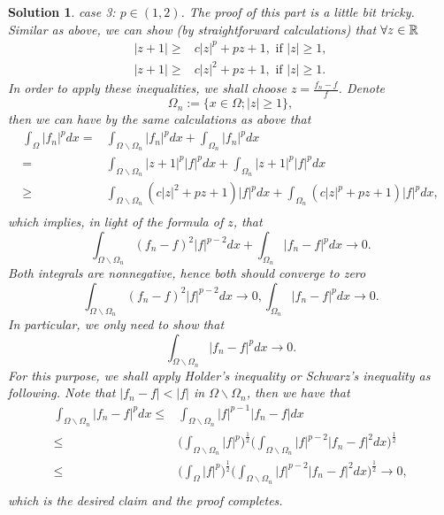 \documentclass[6pt]{article}
\newtheorem{solution}{Solution}
\numberwithin{equation}{section}
\def\mathbb{\Bbb}
\begin{document}
\begin{enumerate}
\begin{solution}
case 3: $p\in(1,2)$.  The proof of this part is a little bit tricky.  Similar as above, we can show (by straightforward calculations) that $\forall z\in\mathbb R$
\begin{align*}
  |z+1| \geq & c|z|^p+pz+1,\text{~if~}|z|\geq1, \\
  |z+1| \geq & c|z|^2+pz+1,\text{~if~}|z|\geq1.
\end{align*}
In order to apply these inequalities, we shall choose $z=\frac{f_n-f}{f}$.  Denote
\[\Omega_n:=\{x\in\Omega; |z|\geq1\},\]
then we can have by the same calculations as above that
\begin{align*}
  \int_\Omega |f_n|^pdx =&\int_{\Omega\backslash\Omega_n}|f_n|^pdx+\int_{\Omega_n}|f_n|^pdx   \\
   =&\int_{\Omega\backslash\Omega_n}|z+1|^p|f|^pdx+\int_{\Omega_n}|z+1|^p|f|^pdx   \\
   \geq & \int_{\Omega\backslash\Omega_n}(c|z|^2+pz+1)|f|^pdx+\int_{\Omega_n}(c|z|^p+pz+1)|f|^pdx,   \\
\end{align*}
which implies, in light of the formula of $z$, that
\[\int_{\Omega\backslash\Omega_n}(f_n-f)^2|f|^{p-2}dx+\int_{\Omega_n}|f_n-f|^pdx\rightarrow 0.\]
Both integrals are nonnegative, hence both should converge to zero
\[\int_{\Omega\backslash\Omega_n}(f_n-f)^2|f|^{p-2}dx\rightarrow 0, \int_{\Omega_n}|f_n-f|^pdx\rightarrow 0.\]
In particular, we only need to show that
\[\int_{\Omega\backslash\Omega_n}|f_n-f|^pdx\rightarrow 0.\]
For this purpose, we shall apply Holder's inequality or Schwarz's inequality as following.  Note that $|f_n-f|<|f|$ in $\Omega\backslash\Omega_n$, then we have that
\begin{align*}
  \int_{\Omega\backslash\Omega_n}|f_n-f|^pdx\leq  & \int_{\Omega\backslash\Omega_n}|f|^{p-1} |f_n-f|dx  \\
   \leq & \Big(\int_{\Omega\backslash\Omega_n}|f|^{p} \Big)^\frac{1}{2}\Big(\int_{\Omega\backslash\Omega_n}|f|^{p-2} |f_n-f|^2dx \Big)^\frac{1}{2} \\
  \leq  &   \Big(\int_{\Omega}|f|^{p} \Big)^\frac{1}{2}\Big(\int_{\Omega\backslash\Omega_n}|f|^{p-2} |f_n-f|^2dx \Big)^\frac{1}{2}\rightarrow 0, \\
\end{align*}
which is the desired claim and the proof completes.
\end{solution}

\end{enumerate}
\end{document}
